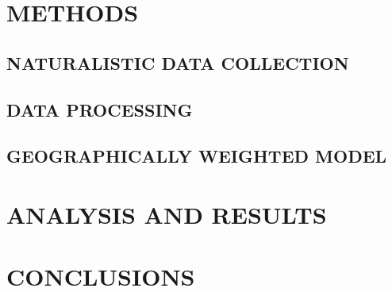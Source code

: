 \chapter{METHODS}

\section{NATURALISTIC DATA COLLECTION}

\section{DATA PROCESSING}

\section{GEOGRAPHICALLY WEIGHTED MODEL} \label{gwm}


\chapter{ANALYSIS AND RESULTS}


\chapter{CONCLUSIONS}
